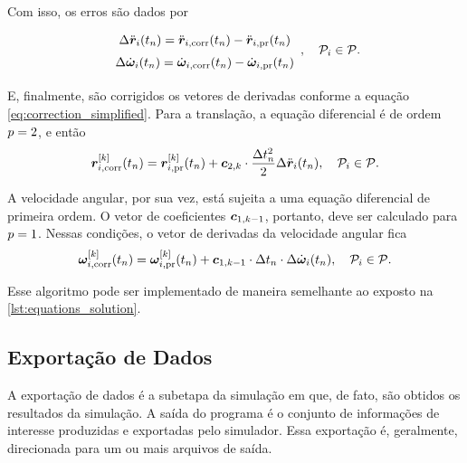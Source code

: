 Com isso, os erros são dados por
\begin{equation*}
	\def\arraystretch{1.5}
	\begin{array}{c}
		\Delta \accelerationi\pqty{\instant[n]} = \accelerationicorr\pqty{\instant[n]} - \accelerationipr\pqty{\instant[n]} \\
		\Delta \dangularVelocityi{1}\pqty{\instant[n]} = \dangularVelocityicorr{1}\pqty{\instant[n]} - \dangularVelocityipr{1}\pqty{\instant[n]} \\
	\end{array}, \quad\particlei\in\particleSet.
\end{equation*}

E, finalmente, são corrigidos os vetores de derivadas conforme a equação \eqref{eq:correction_simplified}. Para a translação, a equação diferencial é de ordem \(\eqOrder = 2\), e então
\begin{equation*}
	\drvec{\taylorOrder}{\positionicorr}\pqty{\instant[n]} = \drvecipr{\taylorOrder}{\position}\pqty{\instant[n]} + \correctorConstantVector{\taylorOrder}{2}\cdot\dfrac{\Dt[n]^2}{2}\Delta \accelerationi\pqty{\instant[n]}, \quad\particlei\in\particleSet.
\end{equation*}

A velocidade angular, por sua vez, está sujeita a uma equação diferencial de primeira ordem. O vetor de coeficientes \(\correctorConstantVector{\taylorOrder-1}{1}\), portanto, deve ser calculado para \(\eqOrder=1\). Nessas condições, o vetor de derivadas da velocidade angular fica
\begin{equation*}
		\drvec{\taylorOrder}{\angularVelocityicorr}\pqty{\instant[n]} = \drvec{\taylorOrder}{\angularVelocityipr}\pqty{\instant[n]} + \correctorConstantVector{\taylorOrder-1}{1}\cdot\Dt[n]\cdot\Delta \dangularVelocityi{1}\pqty{\instant[n]}, \quad\particlei\in\particleSet.
\end{equation*}

Esse algoritmo pode ser implementado de maneira semelhante ao exposto na \cref{lst:equations_solution}.

\subsection{Exportação de Dados}

A exportação de dados é a subetapa da simulação em que, de fato, são obtidos os resultados da simulação. A saída do programa é o conjunto de informações de interesse produzidas e exportadas pelo simulador. Essa exportação é, geralmente, direcionada para um ou mais arquivos de saída.

